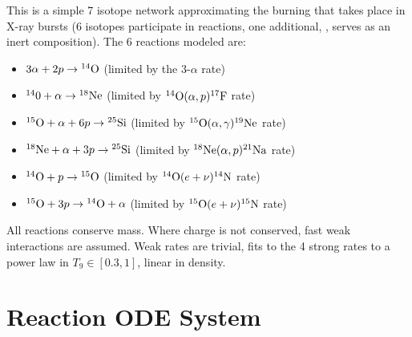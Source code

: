 This is a simple 7 isotope network approximating the burning that
takes place in X-ray bursts (6 isotopes participate in reactions, one
additional, , serves as an inert composition).  The 6 reactions
modeled are:
\begin{itemize}
\item $3\alpha + 2p \rightarrow \isotm{O}{14}$  (limited by the 3-$\alpha$ rate)

\item $\isotm{0}{14} + \alpha \rightarrow \isotm{Ne}{18}$
  (limited by $\isotm{O}{14}(\alpha,p)\isotm{F}{17}$ rate)

\item $\isotm{O}{15} + \alpha + 6 p \rightarrow \isotm{Si}{25}$
  (limited by $\isotm{O}{15}(\alpha,\gamma)\isotm{Ne}{19}$ rate)

\item $\isotm{Ne}{18} + \alpha + 3p \rightarrow \isotm{Si}{25}$
  (limited by $\isotm{Ne}{18}(\alpha,p)\isotm{Na}{21}$ rate)

\item $\isotm{O}{14} + p \rightarrow \isotm{O}{15}$
  (limited by $\isotm{O}{14}(e+\nu)\isotm{N}{14}$ rate)

\item $\isotm{O}{15} + 3p \rightarrow \isotm{O}{14} + \alpha$
  (limited by $\isotm{O}{15}(e+\nu)\isotm{N}{15}$ rate)
\end{itemize}
All reactions conserve mass.  Where charge is not conserved, fast weak
interactions are assumed.  Weak rates are trivial, fits to the 4
strong rates to a power law in $T_9 \in [0.3, 1]$, linear in density.



\section{Reaction ODE System}

